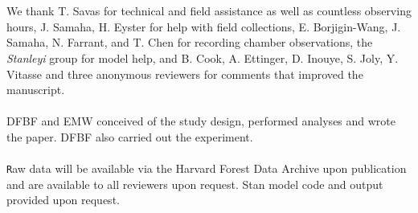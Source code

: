 \documentclass[11pt]{article}
\begin{document}


\vspace{2ex}\\
\vspace{1ex}\\
We thank T. Savas for technical and field assistance as well as countless observing hours, J. Samaha, H. Eyster for help with field collections, E. Borjigin-Wang, J. Samaha, N. Farrant, and T. Chen for recording chamber observations, the \emph{Stanleyi} group for model help, and B. Cook, A. Ettinger, D. Inouye, S. Joly, Y. Vitasse and three anonymous reviewers for comments that improved the manuscript. 
\vspace{2ex}\\
\vspace{1ex}\\
DFBF and EMW conceived of the study design, performed analyses and wrote the paper. DFBF also carried out the experiment.
\vspace{2ex}\\
\vspace{1ex}\\
\texttt Raw data will be available via the Harvard Forest Data Archive upon publication and are available to all reviewers upon request. {Stan} model code and output provided upon request.
\newpage
\end{document}
